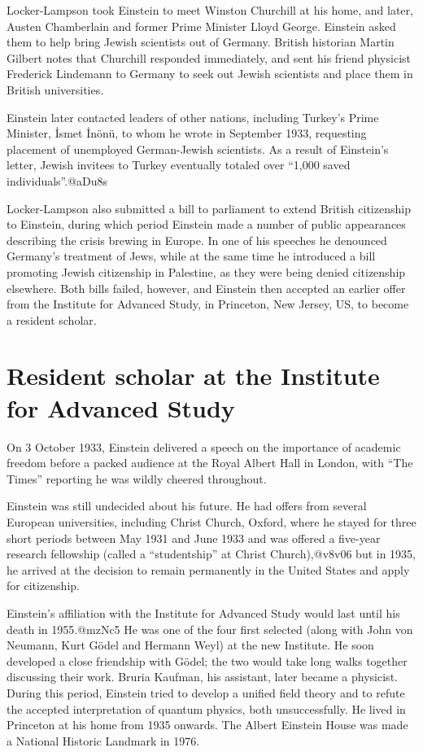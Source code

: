 \documentclass[twoside]{memoir}
\begin{document}
Locker-Lampson took Einstein to meet Winston Churchill at his home, and later, Austen Chamberlain and former Prime Minister Lloyd George. Einstein asked them to help bring Jewish scientists out of Germany. British historian Martin Gilbert notes that Churchill responded immediately, and sent his friend physicist Frederick Lindemann to Germany to seek out Jewish scientists and place them in British universities.

Einstein later contacted leaders of other nations, including Turkey's Prime Minister, İsmet İnönü, to whom he wrote in September 1933, requesting placement of unemployed German-Jewish scientists. As a result of Einstein's letter, Jewish invitees to Turkey eventually totaled over \enquote{1,000 saved individuals}.@aDu8s

Locker-Lampson also submitted a bill to parliament to extend British citizenship to Einstein, during which period Einstein made a number of public appearances describing the crisis brewing in Europe. In one of his speeches he denounced Germany's treatment of Jews, while at the same time he introduced a bill promoting Jewish citizenship in Palestine, as they were being denied citizenship elsewhere. Both bills failed, however, and Einstein then accepted an earlier offer from the Institute for Advanced Study, in Princeton, New Jersey, US, to become a resident scholar.
\section{Resident scholar at the Institute for Advanced Study}
On 3 October 1933, Einstein delivered a speech on the importance of academic freedom before a packed audience at the Royal Albert Hall in London, with \enquote{The Times} reporting he was wildly cheered throughout.

Einstein was still undecided about his future. He had offers from several European universities, including Christ Church, Oxford, where he stayed for three short periods between May 1931 and June 1933 and was offered a five-year research fellowship (called a \enquote{studentship} at Christ Church),\cite{FFt5E}@v8v06 but in 1935, he arrived at the decision to remain permanently in the United States and apply for citizenship.

Einstein's affiliation with the Institute for Advanced Study would last until his death in 1955.@mzNc5 He was one of the four first selected (along with John von Neumann, Kurt Gödel and Hermann Weyl) at the new Institute. He soon developed a close friendship with Gödel; the two would take long walks together discussing their work. Bruria Kaufman, his assistant, later became a physicist. During this period, Einstein tried to develop a unified field theory and to refute the accepted interpretation of quantum physics, both unsuccessfully. He lived in Princeton at his home from 1935 onwards. The Albert Einstein House was made a National Historic Landmark in 1976.
\end{document}
